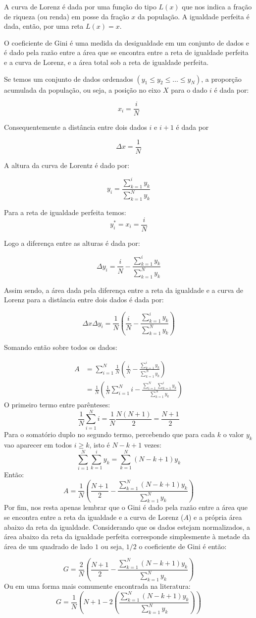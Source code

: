 A curva de Lorenz é dada por uma função do tipo $L(x)$ que nos indica a fração de riqueza (ou renda) em posse da fração $x$ da população. A igualdade perfeita é dada, então, por uma reta $L(x)=x$.

O coeficiente de Gini é uma medida da desigualdade em um conjunto de dados e é dado pela razão entre a área que se encontra entre a reta de igualdade perfeita e a curva de Lorenz, e a área total sob a reta de igualdade perfeita.

Se temos um conjunto de dados ordenados $(y_1\leq y_2\leq \dots\leq y_N) $, a proporção acumulada da população, ou seja, a posição no eixo $X$ para o dado $i$ é dada por:

$$x_i=\frac{i}{N}$$

Consequentemente a distância entre dois dados $i$ e $i+1$ é dada por

$$\Delta x =\frac{1}{N}$$

A altura da curva de Lorentz é dado por:

$$y_i=\frac{\sum_{k=1}^{i}y_{k}}{\sum_{k=1}^{N}y_{k}}$$

Para a reta de igualdade perfeita temos:
$$y_{i}^{*}=x_{i}=\frac{i}{N}$$

Logo a diferença entre as alturas é dada por:

$$\Delta y_i=\frac{i}{N}-\frac{\sum_{k=1}^{i}y_{k}}{\sum_{k=1}^{N}y_{k}}$$

Assim sendo, a área dada pela diferença entre a reta da igualdade e a curva de Lorenz para a distância entre dois dados é dada por:

$$\Delta x\Delta y_i=\frac{1}{N}\left(\frac{i}{N}-\frac{\sum_{k=1}^{i}y_{k}}{\sum_{k=1}^{N}y_{k}}\right)$$

Somando então sobre todos os dados:

\begin{equation}
    \begin{split}
        A	&=\sum_{i=1}^{N}\frac{1}{N}\left(\frac{i}{N}-\frac{\sum_{k=1}^{i}y_{k}}{\sum_{k=1}^{N}y_{k}}\right) \\
	&=\frac{1}{N}\left(\frac{1}{N}\sum_{i=1}^{N}i-\frac{\sum_{i=1}^{N}\sum_{k=1}^{i}y_{k}}{\sum_{k=1}^{N}y_{k}}\right)
    \end{split}
\end{equation}
O primeiro termo entre parênteses:
$$\frac{1}{N}\sum_{i=1}^{N}i=\frac{1}{N}\frac{N\left(N+1\right)}{2}=\frac{N+1}{2}$$
Para o somatório duplo no segundo termo, percebendo que para cada $k$  o valor $y_k$ vao aparecer em todos $i\geq k$, isto é $N-k+1$ vezes:
$$\sum_{i=1}^{N}\sum_{k=1}^{i}y_{k}=\sum_{k=1}^{N}\left(N-k+1\right)y_{k}$$
Então:
$$A	=\frac{1}{N}\left(\frac{N+1}{2}-\frac{\sum_{k=1}^{N}\left(N-k+1\right)y_{k}}{\sum_{k=1}^{N}y_{k}}\right)$$
Por fim, nos resta apenas lembrar que o Gini é dado pela razão entre a área que se encontra entre a reta da igualdade e a curva de Lorenz ($A$) e a própria área abaixo da reta da igualdade. Considerando que os dados estejam normalizados, a área abaixo da reta da igualdade perfeita corresponde simplesmente à metade da área de um quadrado de lado $1$ ou seja, $1/2$ o coeficiente de Gini é então:

$$G	=\frac{2}{N}\left(\frac{N+1}{2}-\frac{\sum_{k=1}^{N}\left(N-k+1\right)y_{k}}{\sum_{k=1}^{N}y_{k}}\right)$$
Ou em uma forma mais comumente encontrada na literatura\cite{gini}:
$$G=\frac{1}{N}\left(N+1-2\left(\frac{\sum_{k=1}^{N}\left(N-k+1\right)y_{k}}{\sum_{k=1}^{N}y_{k}}\right)\right)$$